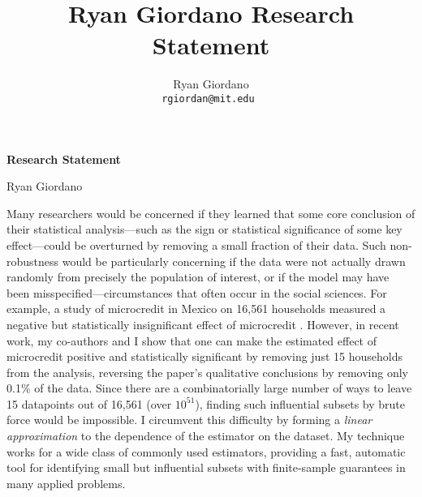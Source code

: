 
\usepackage{enumitem}

\usepackage{geometry}
\geometry{top=1.0in}
\geometry{left=1.1in}
\geometry{right=1.1in}

\title{Ryan Giordano Research Statement}

\author{
  Ryan Giordano \\ \texttt{rgiordan@mit.edu }
}



\begin{minipage}[t]{0.5\textwidth}
\hspace{-2em} %
{\bf \LARGE Research Statement}\\
\end{minipage}
\begin{minipage}[t]{0.5\textwidth}
        \hspace{8em} %
        {\LARGE Ryan Giordano}
\end{minipage}

Many researchers would be concerned if they learned that some core conclusion of
their statistical analysis---such as the sign or statistical significance of
some key effect---could be overturned by removing a small fraction of their
data. Such non-robustness would be particularly concerning if the data were not
actually drawn randomly from precisely the population of interest, or if the
model may have been misspecified---circumstances that often occur in the social
sciences. For example, a study of microcredit in Mexico on 16,561 households
measured a negative but statistically insignificant effect of microcredit
\citep{angelucci:2015:microcredit}.  However, in recent work, my co-authors and
I show that one can make the estimated effect of microcredit positive and
statistically significant by removing just 15 households from the analysis,
reversing the paper's qualitative conclusions by removing only 0.1\% of the
data.  Since there are a combinatorially large number of ways to leave 15
datapoints out of 16,561 (over $10^{51}$), finding such influential subsets by
brute force would be impossible.  I circumvent this difficulty by forming a
\emph{linear approximation} to the dependence of the estimator on the dataset.
My technique works for a wide class of commonly used estimators, providing a
fast, automatic tool for identifying small but influential subsets with
finite-sample guarantees in many applied problems.

